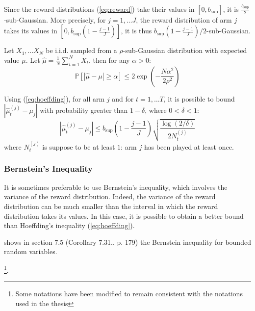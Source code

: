 \documentclass{statsmsc}
\begin{document}
Since the reward distributions (\ref{eq:reward}) take their values in $[0,b_{\sup}]$, it is $\frac{b_{\sup}}{2}$-sub-Gaussian. More precisely, for $j = 1, \dots J$, the reward distribution of arm $j$ takes its values in $\left[0, b_{\sup}\left(1 - \frac{j-1}{J}\right)\right]$, it is thus $b_{\sup}\left(1 - \frac{j-1}{J}\right)/2$-sub-Gaussian.
\begin{theorem}
  Let $X_1, \dots X_N$ be i.i.d. sampled from a $\rho$-sub-Gaussian distribution with expected value $\mu$. Let $\hat{\mu} = \frac{1}{N}\sum_{t = 1}^N X_t$, then for any $\alpha > 0$:
  \begin{equation}
    \mathbb{P}\left[\left|\hat{\mu} - \mu\right|\geq \alpha\right]\leq 2 \exp\left(-\frac{N \alpha^2}{2\rho^2}\right)
    \label{eq:hoeffding}
  \end{equation}  
\end{theorem}

Using (\ref{eq:hoeffding}), for all arm $j$ and for $t = 1, \dots T$, it is possible to bound $\left|\hat{\mu}_t^{(j)} - \mu_j\right|$ with probability greater than $1- \delta$, where $0 <\delta<1$:
 \begin{equation}
  \left|\hat{\mu}_t^{(j)} - \mu_j\right| \leq b_{\sup}\left(1 - \frac{j-1}{J}\right)\sqrt{\frac{\log(2/\delta)}{2 N_t^{(j)}}}
  \label{eq:hoeffding_bound}
\end{equation}
where $N_t^{(j)}$ is suppose to be at least $1$: arm $j$ has been played at least once.

\subsubsection{Bernstein's Inequality}
It is sometimes preferable to use Bernstein's inequality, which involves the variance of the reward distribution.
Indeed, the variance of the reward distribution can be much smaller than the interval in which the reward distribution takes its values. In this case, it is possible to obtain a better bound than Hoeffding's inequality (\ref{eq:hoeffding}).

\cite{foucart13} shows in section 7.5 (Corollary 7.31., p. 179) the Bernstein inequality for bounded random variables.

\citep{foucart13}\footnote{Some notations have been modified to remain consistent with the notations used in the thesis}.
\end{document}
